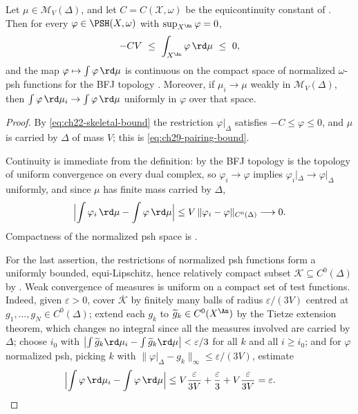 \begin{proposition}
\label{prop:ch29-skeletal-pairing}
Let $\mu\in\mathcal M_V(\Delta)$, and let $C=C(\mathcal X,\omega)$ be
the equicontinuity constant of .  Then
for every $\varphi\in\PSH(X,\omega)$ with $\sup_{X^{\An}}\varphi=0$,
\begin{equation}
\label{eq:ch29-pairing-bound}
 -CV\ \leq\ \int_{X^{\An}}\varphi\,\rd\mu\ \leq\ 0 ,
\end{equation}
and the map
$\varphi\mapsto\int\varphi\,\rd\mu$ is continuous on the compact space of
normalized $\omega$-psh functions for the BFJ topology
.  Moreover, if $\mu_i\to\mu$ weakly in
$\mathcal M_V(\Delta)$, then
$\int\varphi\,\rd\mu_i\to\int\varphi\,\rd\mu$ uniformly in $\varphi$
over that space.
\end{proposition}

\begin{proof}
By \eqref{eq:ch22-skeletal-bound} the restriction $\varphi|_\Delta$
satisfies $-C\leq\varphi\leq0$, and $\mu$ is carried by $\Delta$ of
mass $V$; this is \eqref{eq:ch29-pairing-bound}.

Continuity is immediate from the definition: by
 the BFJ topology is the topology of uniform
convergence on every dual complex, so $\varphi_i\to\varphi$ implies
$\varphi_i|_\Delta\to\varphi|_\Delta$ uniformly, and since $\mu$ has
finite mass carried by $\Delta$,
\[
 \Bigl|\int\varphi_i\,\rd\mu-\int\varphi\,\rd\mu\Bigr|
 \leq V\,\lVert\varphi_i-\varphi\rVert_{C^0(\Delta)}
 \longrightarrow0 .
\]
Compactness of the normalized psh space is
.

For the last assertion, the restrictions of normalized psh functions form a
uniformly bounded, equi-Lipschitz, hence relatively compact subset
$\mathcal K\subseteq C^0(\Delta)$ by
.  Weak convergence of measures is uniform on
a compact set of test functions.  Indeed, given $\varepsilon>0$, cover
$\overline{\mathcal K}$ by finitely many balls of radius
$\varepsilon/(3V)$ centred at $g_1,\dots,g_N\in C^0(\Delta)$; extend
each $g_k$ to $\widetilde g_k\in C^0(X^{\An})$ by the Tietze extension
theorem, which changes no integral since all the measures involved are
carried by $\Delta$; choose $i_0$ with
$\bigl|\int\widetilde g_k\rd\mu_i-\int\widetilde g_k\rd\mu\bigr|
<\varepsilon/3$ for all $k$ and all $i\geq i_0$; and for
$\varphi$ normalized psh, picking $k$ with
$\lVert\varphi|_\Delta-g_k\rVert_\infty\leq\varepsilon/(3V)$, estimate
\[
 \Bigl|\int\varphi\,\rd\mu_i-\int\varphi\,\rd\mu\Bigr|
 \leq V\frac{\varepsilon}{3V}+\frac\varepsilon3+V\frac{\varepsilon}{3V}
 =\varepsilon .\qquad
\]
\end{proof}

